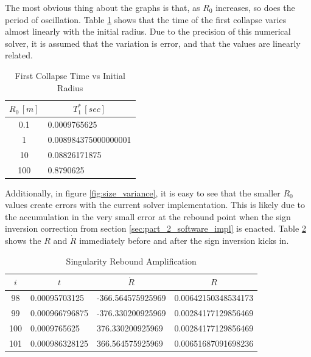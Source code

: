 \documentclass[12pt]{article}
\begin{document}
The most obvious thing about the graphs is that, as $R_0$ increases, so does the period of oscillation. Table \ref{tbl:part_2_t_star} shows that the time of the first collapse varies almost linearly with the initial radius. Due to the precision of this numerical solver, it is assumed that the variation is error, and that the values are linearly related.

\begin{table}[H]
    \centering
    \caption{First Collapse Time vs Initial Radius}
    \label{tbl:part_2_t_star}
    \begin{tabular}{|c|l|}
        \hline
        $R_0 \, [m]$ & \multicolumn{1}{|c|}{$T^*_1 \, [sec]$} \\
        \hline
        0.1 & 0.0009765625 \\
        1 & 0.008984375000000001 \\
        10 & 0.08826171875 \\
        100 & 0.8790625 \\
        \hline
    \end{tabular}
\end{table}

Additionally, in figure \ref{fig:size_variance}, it is easy to see that the smaller $R_0$ values create errors with the current solver implementation. This is likely due to the accumulation in the very small error at the rebound point when the sign inversion correction from section \ref{sec:part_2_software_impl} is enacted. Table \ref{tbl:part_2_rebound} shows the $R$ and $\dot R$ immediately before and after the sign inversion kicks in.

\begin{table}[H]
    \centering
    \caption{Singularity Rebound Amplification}
    \label{tbl:part_2_rebound}
    \begin{tabular}{|c|l|l|l|}
        \hline
        $i$ & \multicolumn{1}{|c|}{$t$} & \multicolumn{1}{|c|}{$\dot R$} &  \multicolumn{1}{|c|}{$R$}\\
        \hline
        98 & 0.00095703125 & -366.564575925969 & 0.00642150348534173 \\
        99 & 0.000966796875 & -376.330200925969 & 0.00284177129856469 \\
        100 & 0.0009765625 & 376.330200925969 & 0.00284177129856469 \\
        101 & 0.000986328125 & 366.564575925969 & 0.00651687091698236 \\
        \hline
    \end{tabular}
\end{table}
\end{document}
